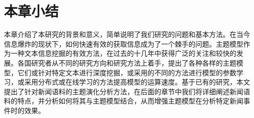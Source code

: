 \section{本章小结}
本章介绍了本研究的背景和意义，简单说明了我们研究的问题和基本方法。在当今信息爆炸的现状下，如何快速有效的获取信息成为了一个棘手的问题。主题模型作为一种文本信息挖掘的有效方法，在过去的十几年中获得广泛的关注和较快的发展。各国研究者从不同的研究方向和研究方法上着手，提出了各种各样的主题模型，它们或针对特定文本进行深度挖掘，或采用的不同的方法进行模型的参数学习，或采用分布式或在线学习的方法提高模型的运算速度。基于已有的研究，本文提出了针对新闻语料的主题演化分析方法，在后面的章节中我们将详细阐述新闻语料的特点，并分析如何将其与主题模型结合，从而增强主题模型在分析特定新闻事件时的效果。


